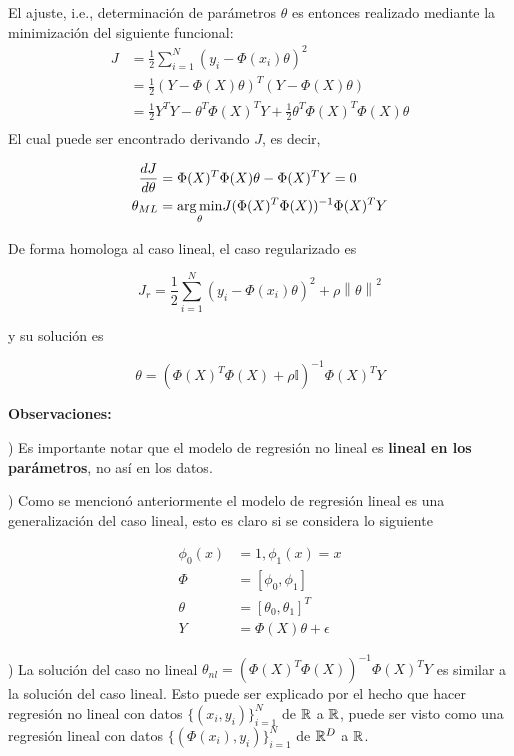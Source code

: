 El ajuste, i.e., determinación de parámetros $\theta$ es entonces realizado mediante la minimización del siguiente funcional:
\begin{align}
    J &= \frac{1}{2} \sum_{i=1}^N(y_i - \Phi(x_i)\theta)^2\\
    &= \frac{1}{2} (Y-\Phi(X)\theta)^T(Y-\Phi(X)\theta)\\
    &= \frac{1}{2}Y^TY - \theta^T\Phi(X)^TY + \frac{1}{2}\theta^T\Phi(X)^T\Phi(X)\theta\\
\end{align}
El cual puede ser encontrado derivando $J$, es decir,

\begin{align}
    \frac{dJ}{d\theta} &= \Phi(X)^T\Phi(X)\theta - \Phi(X)^TY = 0\\
    \theta_{ML}&=\underset{\theta}{\operatorname*{arg\,min}} J (\Phi(X)^T\Phi(X))^{-1}\Phi(X)^TY
\end{align}


De forma homologa al caso lineal, el caso regularizado es

\begin{equation}
    J_r = \frac{1}{2} \sum_{i=1}^N(y_i - \Phi(x_i)\theta)^2 + \rho\left \| \theta \right \|^2
\end{equation}

y su solución es

\begin{equation}
    \theta = (\Phi(X)^T\Phi(X)+\rho\mathbb{I})^{-1}\Phi(X)^TY
\end{equation}

\noindent\textbf{Observaciones:}

) Es importante notar que el modelo de regresión no lineal es \textbf{lineal en los parámetros}, no así en los datos.

) Como se mencionó anteriormente el modelo de regresión lineal es una generalización del caso lineal, esto es claro si se considera lo siguiente

\begin{align}
    \phi_0(x) &= 1, \phi_1(x) = x \nonumber\\
    \Phi &= [\phi_0, \phi_1] \nonumber\\
    \theta &= [\theta_0, \theta_1]^T \nonumber\\
    Y &= \Phi(X)\theta + \epsilon \nonumber
\end{align}

) La solución del caso no lineal $\theta_{nl} = (\Phi(X)^T\Phi(X))^{-1}\Phi(X)^TY$ es similar a la solución del caso lineal. Esto puede ser explicado por el hecho que hacer regresión no lineal con datos $\{(x_i,y_i)\}_{i=1}^N$ de ${\mathbb R}$ a ${\mathbb R}$, puede ser visto como una regresión lineal con datos $\{(\Phi(x_i),y_i)\}_{i=1}^N$ de ${\mathbb R}^D$ a ${\mathbb R}$.


